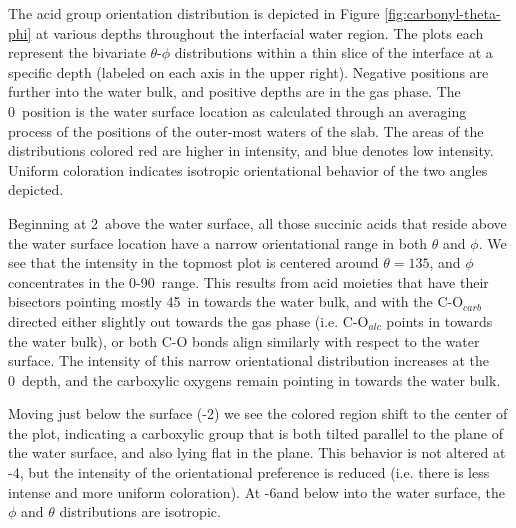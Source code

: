 The acid group orientation distribution is depicted in Figure \ref{fig:carbonyl-theta-phi} at various depths throughout the interfacial water region. The plots each represent the bivariate $\theta$-$\phi$ distributions within a thin slice of the interface at a specific depth (labeled on each axis in the upper right). Negative positions are further into the water bulk, and positive depths are in the gas phase. The 0\angs~position is the water surface location as calculated through an averaging process of the positions of the outer-most waters of the slab. The areas of the distributions colored red are higher in intensity, and blue denotes low intensity. Uniform coloration indicates isotropic orientational behavior of the two angles depicted.

Beginning at 2\angs~above the water surface, all those succinic acids that reside above the water surface location have a narrow orientational range in both $\theta$ and $\phi$. We see that the intensity in the topmost plot is centered around $\theta=135$\textdegree, and $\phi$ concentrates in the 0-90\textdegree~range. This results from acid moieties that have their bisectors pointing mostly 45\textdegree~in towards the water bulk, and with the C-O$_{carb}$ directed either slightly out towards the gas phase (i.e. C-O$_{alc}$ points in towards the water bulk), or both C-O bonds align similarly with respect to the water surface. The intensity of this narrow orientational distribution increases at the 0\angs~depth, and the carboxylic oxygens remain pointing in towards the water bulk.

Moving just below the surface (-2\angs) we see the colored region shift to the center of the plot, indicating a carboxylic group that is both tilted parallel to the plane of the water surface, and also lying flat in the plane. This behavior is not altered at -4\angs, but the intensity of the orientational preference is reduced (i.e. there is less intense and more uniform coloration). At -6\angs and below into the water surface, the $\phi$ and $\theta$ distributions are isotropic.

